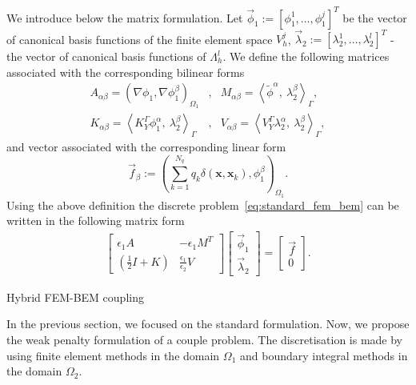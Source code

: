 We introduce below the matrix formulation. Let $\vec{\phi}_1 := [\phi_1^1, \dots, \phi_1^j]^T$ be the vector of canonical basis
functions of the finite element space $V_{h}^{j}$, %
$\vec{\lambda}_2 := [\lambda_2^1, \dots, \lambda_2^l]^T$ - the vector of canonical basis
functions of $\Lambda_{h}^{l}$. %
We define the following matrices  associated with the corresponding bilinear forms
\begin{align*}
A_{\alpha \beta} = \left(\nabla \phi_1, \nabla \phi_1^{\beta} \right)_{\Omega_1}  
&,&
M_{\alpha \beta} = \left< \widetilde{\phi}^{\alpha}, \ \lambda^{\beta}_2 \right>_{\Gamma}, \\
K_{\alpha \beta} = \left<K_{Y}^{\Gamma} \phi^{\alpha}_1, \ \lambda^{\beta}_2 \right>_{\Gamma}
 &,&
V_{\alpha \beta} = \left<V_{Y}^{\Gamma} \lambda^{\alpha}_2, \ \lambda^{\beta}_2 \right>_{\Gamma}, 
\end{align*}
and vector associated with the corresponding linear form
\begin{equation*}
\vec{f}_{\beta} := \left(  \sum_{k=1}^{N_q} q_k\delta(\mathbf{x},\mathbf{x}_k),  \phi_1^{\beta} \right)_{\Omega_1}.
\end{equation*}
Using the above definition the discrete problem~\eqref{eq:standard_fem_bem} can be written in the following matrix form
\begin{align*}
\begin{bmatrix}
\epsilon_1 A &  - \epsilon_1 M^T \\  
\left(\tfrac12 I + K \right) &  \tfrac{\epsilon_1}{\epsilon_2} V 
\end{bmatrix}
\begin{bmatrix}
\vec{\phi}_1 \\  
\vec{\lambda}_2
\end{bmatrix}
= 
\begin{bmatrix}
\vec{f} \\  
0
\end{bmatrix}.
\end{align*}


{\sffamily \small Hybrid FEM-BEM coupling}
    
  In the previous section, we focused on the standard formulation. Now, we propose the weak penalty formulation of a couple problem. The discretisation is made by using finite element methods in the domain $\Omega_1$ and boundary integral methods in the domain $\Omega_2$.
  
